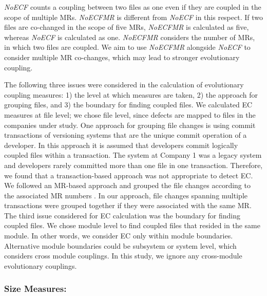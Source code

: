 \documentclass[times]{smrauth}
\begin{document}
%

\textit{NoECF} counts a coupling between two files as one even if they are coupled in the scope of multiple MRs. \textit{NoECFMR} is different from \textit{NoECF} in this respect. If two files are co-changed in the scope of five MRs, \textit{NoECFMR} is calculated as five, whereas \textit{NoECF} is calculated as one. \textit{NoECFMR} considers the number of MRs, in which two files are coupled. We aim to use \textit{NoECFMR} alongside \textit{NoECF} to consider multiple MR co-changes, which may lead to stronger evolutionary coupling.

The following three issues were considered in the calculation of evolutionary coupling measures: 1) the level at which measures are taken, 2) the approach for grouping files, and 3) the boundary for finding coupled files. We calculated EC measures at file level; we chose file level, since defects are mapped to files in the companies under study. One approach for grouping file changes is using commit transactions of versioning systems that are the unique commit operation of a developer. In this approach it is assumed that developers commit logically coupled files within a transaction. The system at Company 1 was a legacy system and developers rarely committed more than one file in one transaction. Therefore, we found that a transaction-based approach was not appropriate to detect EC. We followed an MR-based approach and grouped the file changes according to the associated MR numbers \cite{graves2000predicting}. In our approach, file changes spanning multiple transactions were grouped together if they were associated with the same MR. The third issue considered for EC calculation was the boundary for finding coupled files. We chose module level to find coupled files that resided in the same module. In other words, we consider EC only within module boundaries. Alternative module boundaries could be subsystem or system level, which considers cross module couplings. In this study, we ignore any cross-module evolutionary couplings. 


\subsubsection{Size Measures:}
\end{document}
